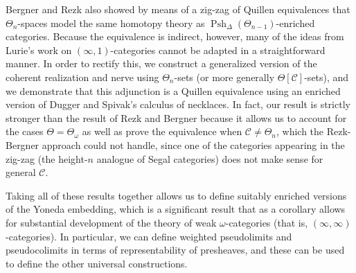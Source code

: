 \documentclass{amsart}
\numberwithin{equation}{section}
\theoremstyle{plain}   %
\theoremstyle{remark}
\theoremstyle{plain}
\DeclareMathOperator{\Psh}{Psh}
\newcommand{\C}{\ensuremath{\mathcal{C}}}
\begin{document}
Bergner and Rezk also showed by means of a zig-zag of Quillen equivalences that \(\Theta_n\)-spaces model the same homotopy theory as \(\Psh_\Delta(\Theta_{n-1})\)-enriched categories.  Because the equivalence is indirect, however, many of the ideas from Lurie's work on \((\infty,1)\)-categories cannot be adapted in a straightforward manner.  In order to rectify this, we construct a generalized version of the coherent realization and nerve using \(\Theta_n\)-sets (or more generally \(\Theta[\C]\)-sets), and we demonstrate that this adjunction is a Quillen equivalence using an enriched version of Dugger and Spivak's calculus of necklaces. In fact, our result is strictly stronger than the result of Rezk and Bergner because it allows us to account for the cases \(\Theta=\Theta_\omega\) as well as prove the equivalence when \(\C\neq \Theta_n\), which the Rezk-Bergner approach could not handle, since one of the categories appearing in the zig-zag (the height-\(n\) analogue of Segal categories) does not make sense for general \(\C\).

Taking all of these results together allows us to define suitably enriched versions of the Yoneda embedding, which is a significant result that as a corollary allows for substantial development of the theory of weak \(\omega\)-categories (that is, \((\infty,\infty)\)-categories). In particular, we can define weighted pseudolimits and pseudocolimits in terms of representability of presheaves, and these can be used to define the other universal constructions.

\end{document}
